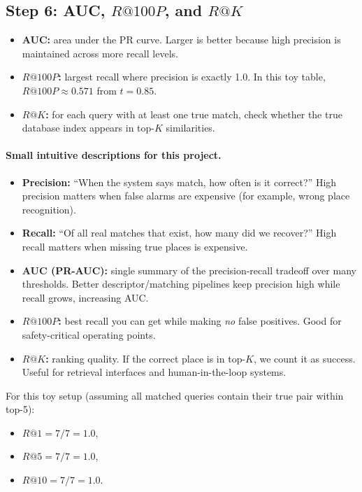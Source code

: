 \documentclass[11pt]{article}
\begin{document}
\subsection{Step 6: AUC, \texorpdfstring{$R@100P$}{R@100P}, and \texorpdfstring{$R@K$}{R@K}}
\begin{itemize}[leftmargin=*]
  \item \textbf{AUC:} area under the PR curve. Larger is better because high precision is maintained across more recall levels.
  \item \textbf{$R@100P$:} largest recall where precision is exactly 1.0. In this toy table, $R@100P \approx 0.571$ from $t=0.85$.
  \item \textbf{$R@K$:} for each query with at least one true match, check whether the true database index appears in top-$K$ similarities.
\end{itemize}

\paragraph{Small intuitive descriptions for this project.}
\begin{itemize}[leftmargin=*]
  \item \textbf{Precision:} ``When the system says match, how often is it correct?''
  High precision matters when false alarms are expensive (for example, wrong place recognition).
  \item \textbf{Recall:} ``Of all real matches that exist, how many did we recover?''
  High recall matters when missing true places is expensive.
  \item \textbf{AUC (PR-AUC):} single summary of the precision-recall tradeoff over many thresholds.
  Better descriptor/matching pipelines keep precision high while recall grows, increasing AUC.
  \item \textbf{$R@100P$:} best recall you can get while making \emph{no} false positives.
  Good for safety-critical operating points.
  \item \textbf{$R@K$:} ranking quality. If the correct place is in top-$K$, we count it as success.
  Useful for retrieval interfaces and human-in-the-loop systems.
\end{itemize}

For this toy setup (assuming all matched queries contain their true pair within top-5):
\begin{itemize}[leftmargin=*]
  \item $R@1 = 7/7 = 1.0$,
  \item $R@5 = 7/7 = 1.0$,
  \item $R@10 = 7/7 = 1.0$.
\end{itemize}
\end{document}
